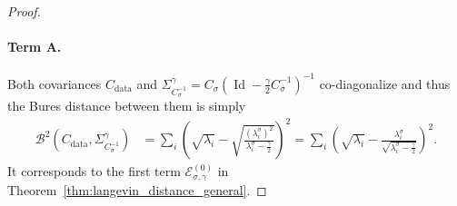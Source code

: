 \documentclass[11pt]{article}
\newcommand{\id}{\operatorname{Id}}
\begin{document}
\begin{proof}
\paragraph{Term A.} Both covariances $C_\mathrm{data}$ and $\Sigma^\gamma_{C_\sigma^{-1}} = C_\sigma\left( \id - \frac{\gamma}{2} C_\sigma^{-1} \right)^{-1} $ co-diagonalize and thus the Bures distance between them is simply  
\begin{align*}
\mathcal{B}^2(C_\mathrm{data}, \Sigma^\gamma_{C_\sigma^{-1}}) &= \sum_i \left(\sqrt{\lambda_i} - \sqrt{\frac{(\lambda_i^\sigma)^2}{\lambda_i^\sigma - \frac{\gamma}{2}}} \right)^2 = \sum_i \left(\sqrt{\lambda_i} - \frac{\lambda_i^\sigma}{\sqrt{\lambda_i^\sigma - \frac{\gamma}{2}}}\right)^2 .
\end{align*}
It corresponds to the first term $\mathcal{E}^{(0)}_{\sigma, \gamma}$ in Theorem~\ref{thm:langevin_distance_general}.

\end{proof}
\end{document}
